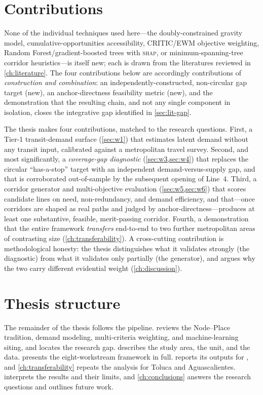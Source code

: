 \section{Contributions}
\label{sec:intro-contributions}

None of the individual techniques used here---the doubly-constrained gravity model,
cumulative-opportunities accessibility, CRITIC/EWM objective weighting, Random
Forest/gradient-boosted trees with \textsc{shap}, or minimum-spanning-tree corridor
heuristics---is itself new; each is drawn from the literatures reviewed in
\cref{ch:literature}. The four contributions below are accordingly contributions of
\emph{construction and combination}: an independently-constructed, non-circular gap
target (new), an anchor-directness feasibility metric (new), and the demonstration that
the resulting chain, and not any single component in isolation, closes the integrative
gap identified in \cref{sec:lit-gap}.

The thesis makes four contributions, matched to the research questions. First, a
Tier-1 transit-demand surface (\cref{sec:w1}) that estimates latent demand without any
transit input, calibrated against a metropolitan travel survey. Second, and most
significantly, a \emph{coverage-gap diagnostic} (\cref{sec:w3,sec:w4}) that replaces the
circular ``has-a-stop'' target with an independent demand-versus-supply gap, and that is
corroborated out-of-sample by the subsequent opening of \zmg Line~4. Third, a corridor
generator and multi-objective evaluation (\cref{sec:w5,sec:w6}) that scores candidate
lines on need, non-redundancy, and demand efficiency, and that---once corridors are
shaped as real paths and judged by anchor-directness---produces at least one
substantive, feasible, merit-passing corridor. Fourth, a demonstration that the entire
framework \emph{transfers} end-to-end to two further metropolitan areas of contrasting
size (\cref{ch:transferability}). A cross-cutting contribution is methodological
honesty: the thesis distinguishes what it validates strongly (the diagnostic) from what
it validates only partially (the generator), and argues why the two carry different
evidential weight (\cref{ch:discussion}).

\section{Thesis structure}
\label{sec:intro-structure}

The remainder of the thesis follows the pipeline.  reviews the
Node--Place tradition, demand modeling, multi-criteria weighting, and machine-learning
siting, and locates the research gap.  describes the study area, the
\ageb unit, and the data.  presents the eight-workstream
framework in full.  reports its outputs for \zmg, and
\cref{ch:transferability} repeats the analysis for Toluca and Aguascalientes.
 interprets the results and their limits, and
\cref{ch:conclusions} answers the research questions and outlines future work.
